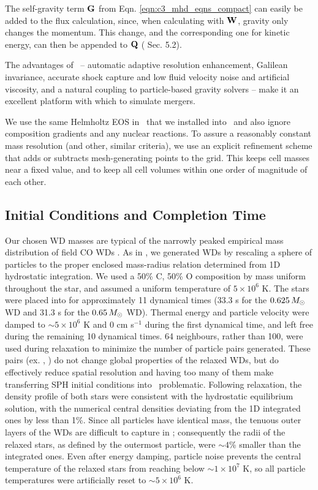 The self-gravity term ${\bf G}$ from Eqn. \ref{eqn:c3_mhd_eqns_compact} can easily be added to the flux calculation, since, when calculating with ${\bf W}$, gravity only changes the momentum.  This change, and the corresponding one for kinetic energy, can then be appended to ${\bf Q}$ (\citealt{spri10} Sec. 5.2).  

The advantages of \arepo\ -- automatic adaptive resolution enhancement, Galilean invariance, accurate shock capture and low fluid velocity noise and artificial viscosity, and a natural coupling to particle-based gravity solvers -- make it an excellent platform with which to simulate mergers.  

We use the same Helmholtz EOS in \arepo\ that we installed into \gasoline\ and also ignore composition gradients and any nuclear reactions.  To assure a reasonably constant mass resolution (and other, similar criteria), we use an explicit refinement scheme \citep{voge+12} that adds or subtracts mesh-generating points to the grid.  This keeps cell masses near a fixed value, and to keep all cell volumes within one order of magnitude of each other.

\subsection{Initial Conditions and Completion Time}
\label{ssec:c3_initcond}

Our chosen WD masses are typical of the narrowly peaked empirical mass distribution of field CO WDs \citep{tremb09, klei+13}.  As in \citeal{zhu+13}, we generated WDs by rescaling a sphere of particles to the proper enclosed mass-radius relation determined from 1D hydrostatic integration.  We used a 50\% C, 50\% O composition by mass uniform throughout the star, and assumed a uniform temperature of $5\times 10^6$ K.  The stars were placed into \gasoline for approximately 11 dynamical times (33.3 s for the $0.625\,\Msun$ WD and 31.3 s for the $0.65\,\Msun$ WD).  Thermal energy and particle velocity were damped to $\sim 5 \times 10^6$ K and 0 cm s$^{-1}$ during the first dynamical time, and left free during the remaining 10 dynamical times.  64 neighbours, rather than 100, were used during relaxation to minimize the number of particle pairs generated.  These pairs (ex. \citealt{dehna12}, \citealt{spri10rev}) do not change global properties of the relaxed WDs, but do effectively reduce spatial resolution and having too many of them make transferring SPH initial conditions into \arepo\ problematic.  Following relaxation, the density profile of both stars were consistent with the hydrostatic equilibrium solution, with the numerical central densities deviating from the 1D integrated ones by less than 1\%.  Since all particles have identical mass, the tenuous outer layers of the WDs are difficult to capture in \gasoline; consequently the radii of the relaxed stars, as defined by the outermost particle, were $\sim 4$\% smaller than the integrated ones.  Even after energy damping, particle noise prevents the central temperature of the relaxed stars from reaching below $\sim 1\times 10^7$ K, so all particle temperatures were artificially reset to $\sim 5 \times 10^6$ K.

